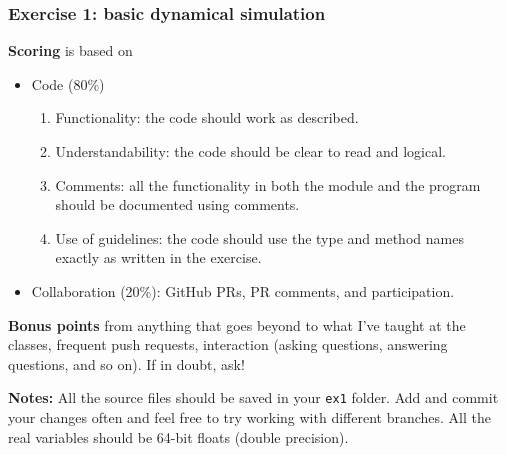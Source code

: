 \begin{frame}
  \frametitle{Exercise 1: basic dynamical simulation}

  \textbf{Scoring} is based on
  \begin{itemize}
   \item Code (80\%)
  \begin{enumerate}
  \item Functionality: the code should work as described.
  \item Understandability: the code should be clear to read and logical.
  \item Comments: all the functionality in both the module and the program should be documented using comments.
  \item Use of guidelines: the code should use the type and method names exactly as written in the exercise.
  \end{enumerate}
  \item Collaboration (20\%): GitHub PRs, PR comments, and participation.
   \end{itemize}

  \textbf{Bonus points} from anything that goes beyond to what I've taught at the classes, frequent push requests, interaction (asking questions, answering questions, and so on). If in doubt, ask!

   \vspace*{2mm}
  \textbf{Notes:} All the source files should be saved in your \texttt{ex1} folder. Add and commit your changes often and feel free to try working with different branches. All the real variables should be 64-bit floats (double precision).

  \end{frame}



